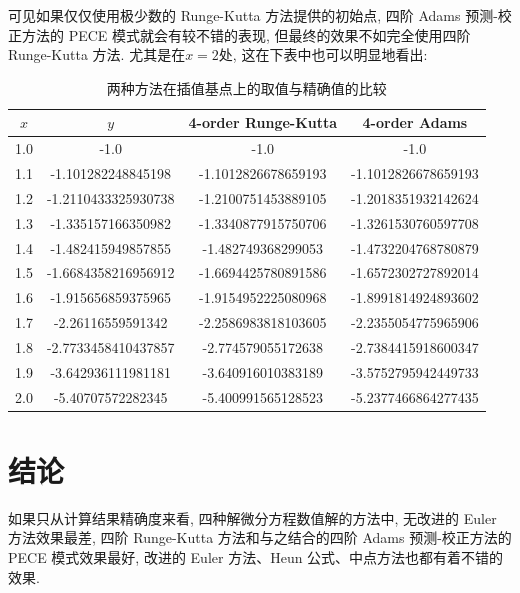\documentclass[UTF8,ctexart,a4paper,11pt,openany]{article}
\theoremstyle{definition}
\begin{document}
            可见如果仅仅使用极少数的 Runge-Kutta 方法提供的初始点, 四阶 Adams 预测-校正方法的 PECE 模式就会有较不错的表现, 但最终的效果不如完全使用四阶 Runge-Kutta 方法. 尤其是在$x=2$处, 这在下表中也可以明显地看出: 

        \begin{table}[H]
            \centering
            \begin{tabular}{cccc}
                \toprule
                $x$   & $y$                   & 4-order Runge-Kutta & 4-order Adams       \\ \midrule
                1.0 & -1.0                & -1.0                & -1.0                \\
                1.1 & -1.101282248845198  & -1.1012826678659193 & -1.1012826678659193 \\
                1.2 & -1.2110433325930738 & -1.2100751453889105 & -1.2018351932142624 \\
                1.3 & -1.335157166350982  & -1.3340877915750706 & -1.3261530760597708 \\
                1.4 & -1.482415949857855  & -1.482749368299053  & -1.4732204768780879 \\
                1.5 & -1.6684358216956912 & -1.6694425780891586 & -1.6572302727892014 \\
                1.6 & -1.915656859375965  & -1.9154952225080968 & -1.8991814924893602 \\
                1.7 & -2.26116559591342   & -2.2586983818103605 & -2.2355054775965906 \\
                1.8 & -2.7733458410437857 & -2.774579055172638  & -2.7384415918600347 \\
                1.9 & -3.642936111981181  & -3.640916010383189  & -3.5752795942449733 \\
                2.0 & -5.40707572282345   & -5.400991565128523  & -5.2377466864277435 \\ \bottomrule
            \end{tabular}
            \caption{两种方法在插值基点上的取值与精确值的比较}
        \end{table}
\section{结论}

        如果只从计算结果精确度来看, 四种解微分方程数值解的方法中, 无改进的 Euler 方法效果最差, 四阶 Runge-Kutta 方法和与之结合的四阶 Adams 预测-校正方法的 PECE 模式效果最好, 改进的 Euler 方法、Heun 公式、中点方法也都有着不错的效果. 
\clearpage
\end{document}
